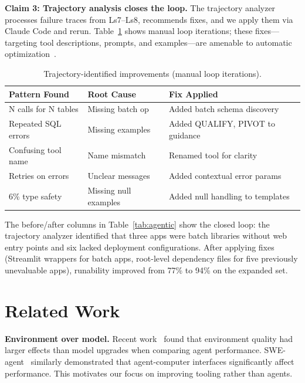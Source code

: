\documentclass[sigconf,review]{acmart}
\begin{document}
\textbf{Claim 3: Trajectory analysis closes the loop.} The trajectory analyzer processes failure traces from Ls7--Ls8, recommends fixes, and we apply them via Claude Code and rerun. Table~\ref{tab:improvements} shows manual loop iterations; these fixes---targeting tool descriptions, prompts, and examples---are amenable to automatic optimization~\cite{gepa2025, khattab2023dspy}.

\begin{table}[h]
\caption{Trajectory-identified improvements (manual loop iterations).}
\label{tab:improvements}
\centering
\small
\begin{tabular}{lp{1.8cm}p{2.4cm}}
\toprule
\textbf{Pattern Found} & \textbf{Root Cause} & \textbf{Fix Applied} \\
\midrule
N calls for N tables & Missing batch op & Added batch schema discovery \\
Repeated SQL errors & Missing examples & Added QUALIFY, PIVOT to guidance \\
Confusing tool name & Name mismatch & Renamed tool for clarity \\
Retries on errors & Unclear messages & Added contextual error params \\
6\% type safety & Missing null examples & Added null handling to templates \\
\bottomrule
\end{tabular}
\end{table}

The before/after columns in Table~\ref{tab:agentic} show the closed loop: the trajectory analyzer identified that three apps were batch libraries without web entry points and six lacked deployment configurations. After applying fixes (Streamlit wrappers for batch apps, root-level dependency files for five previously unevaluable apps), runability improved from 77\% to 94\% on the expanded set.

\section{Related Work}
\label{sec:related}

\textbf{Environment over model.} Recent work~\cite{kniazev2025appbuild} found that environment quality had larger effects than model upgrades when comparing agent performance. SWE-agent~\cite{yang2024swe} similarly demonstrated that agent-computer interfaces significantly affect performance. This motivates our focus on improving tooling rather than agents.
\end{document}
